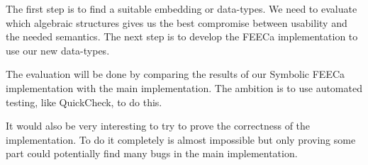 \documentclass{scrartcl}
\begin{document}
The first step is to find a suitable embedding or data-types. We need to evaluate
which algebraic structures gives us the best compromise between usability and
the needed semantics. The next step is to develop the FEECa implementation to
use our new data-types.

The evaluation will be done by comparing the results of our Symbolic FEECa
implementation with the main implementation.
The ambition is to use automated
testing, like QuickCheck, to do this.

It would also be very interesting to try to prove the correctness of the
implementation. To do it completely is almost impossible but only proving some
part could potentially find many bugs in the main implementation.













\end{document}
